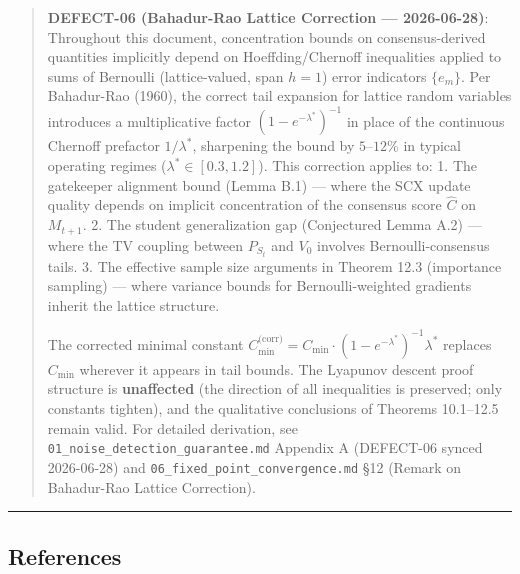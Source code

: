 \documentclass[
  12pt,
]{article}
\begin{document}
\begin{quote}
\textbf{DEFECT-06 (Bahadur-Rao Lattice Correction --- 2026-06-28)}:
Throughout this document, concentration bounds on consensus-derived
quantities implicitly depend on Hoeffding/Chernoff inequalities applied
to sums of Bernoulli (lattice-valued, span \(h=1\)) error indicators
\(\{e_m\}\). Per Bahadur-Rao (1960), the correct tail expansion for
lattice random variables introduces a multiplicative factor
\((1 - e^{-\lambda^*})^{-1}\) in place of the continuous Chernoff
prefactor \(1/\lambda^*\), sharpening the bound by \(5\)--\(12\%\) in
typical operating regimes (\(\lambda^* \in [0.3, 1.2]\)). This
correction applies to: 1. The gatekeeper alignment bound (Lemma B.1) ---
where the SCX update quality depends on implicit concentration of the
consensus score \(\hat{C}\) on \(M_{t+1}\). 2. The student
generalization gap (Conjectured Lemma A.2) --- where the TV coupling
between \(P_{S_t}\) and \(V_0\) involves Bernoulli-consensus tails. 3.
The effective sample size arguments in Theorem 12.3 (importance
sampling) --- where variance bounds for Bernoulli-weighted gradients
inherit the lattice structure.

The corrected minimal constant
\(C_{\min}^{\text{(corr)}} = C_{\min} \cdot (1 - e^{-\lambda^*})^{-1} \lambda^*\)
replaces \(C_{\min}\) wherever it appears in tail bounds. The Lyapunov
descent proof structure is \textbf{unaffected} (the direction of all
inequalities is preserved; only constants tighten), and the qualitative
conclusions of Theorems 10.1--12.5 remain valid. For detailed
derivation, see \texttt{01\_noise\_detection\_guarantee.md} Appendix A
(DEFECT-06 synced 2026-06-28) and
\texttt{06\_fixed\_point\_convergence.md} §12 (Remark on Bahadur-Rao
Lattice Correction).
\end{quote}

\begin{center}\rule{0.5\linewidth}{0.5pt}\end{center}

\subsection{References}\label{references}
\end{document}
